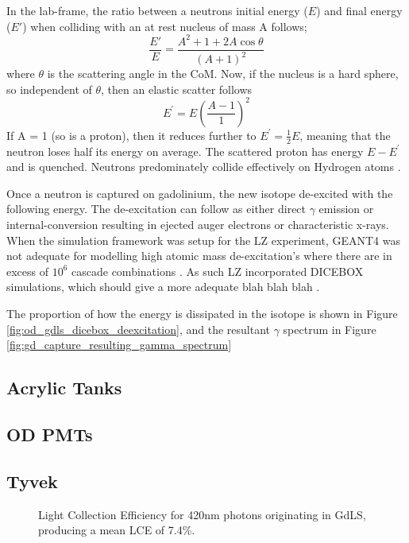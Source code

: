 \par
In the lab-frame, the ratio between a neutrons initial energy ($E$) and final energy ($E'$) when colliding with an at rest nucleus of mass A follows;
\begin{equation}
    \frac{E'}{E} = \frac{A^2 + 1 + 2A\cos{\theta}}{(A + 1)^2}
\end{equation}
where $\theta$ is the scattering angle in the CoM.
Now, if the nucleus is a hard sphere, so independent of $\theta$, then an elastic scatter follows
\begin{equation}
    E^{'} = E(\frac{A-1}{1})^{2}
\end{equation}
If A = 1 (so is a proton), then it reduces further to $E^{'} = \frac{1}{2}E$, meaning that the neutron loses half its energy on average.
The scattered proton has energy $E - E^{'}$ and is quenched.
Neutrons predominately collide effectively on Hydrogen atoms \cite{neutron_thermalisation_and_capture_ref}.




\par
Once a neutron is captured on gadolinium, the new isotope de-excited with the following energy.
The de-excitation can follow as either direct $\gamma$ emission or internal-conversion resulting in ejected auger electrons or characteristic x-rays.
When the simulation framework was setup for the LZ experiment, GEANT4 was not adequate for modelling high atomic mass de-excitation's where there are in excess of $10^{6}$ cascade combinations \cite{ucsb_gdls_dicebox_simulations_ref}.
As such LZ incorporated DICEBOX \cite{dicebox_simulations_ref} simulations, which should give a more adequate blah blah blah \cite{lz_simulations_ref}.
\par
The proportion of how the energy is dissipated in the isotope is shown in Figure \ref{fig:od_gdls_dicebox_deexcitation}, and the resultant $\gamma$ spectrum in Figure \ref{fig:gd_capture_resulting_gamma_spectrum}






\subsection{Acrylic Tanks}

\subsection{OD PMTs}

\subsection{Tyvek}

\begin{figure}[!htbp]
\centering
\resizebox{\textwidth}{!}{

}
\caption{Light Collection Efficiency for 420nm photons originating in GdLS, producing a mean LCE of 7.4\%.}
\label{fig:od_lce}
\end{figure}